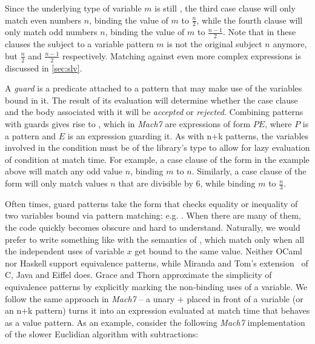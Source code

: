 Since the underlying type of variable $m$ is still , the third case 
clause will only match even numbers $n$, binding the value of $m$ to 
$\frac{n}{2}$, while the fourth clause will only match odd numbers $n$, binding 
the value of $m$ to $\frac{n-1}{2}$.  Note that in these clauses the subject to  
a variable pattern $m$ is not the original subject $n$ anymore, but 
$\frac{n}{2}$ and $\frac{n-1}{2}$ respectively. Matching against even more 
complex expressions is discussed in \textsection\ref{sec:slv}.

A \emph{guard} is a predicate attached to a pattern that may make use of the 
variables bound in it. The result of its evaluation will determine whether the 
case clause and the body associated with it will be \emph{accepted} or 
\emph{rejected}. Combining patterns with guards gives rise to , which in \emph{Mach7} are expressions of form $P$\code{|=}$E$, where $P$ is a 
pattern and $E$ is an expression guarding it. As with n+k patterns, the variables 
involved in the condition must be of the library's type  to allow 
for lazy evaluation of condition at match time. For example, a case clause of 
the form  in  the example above will match any odd value 
$n$, binding $m$ to $n$. Similarly, a case clause of the form  
will only match values $n$ that are divisible by 6, while binding $m$ to $\frac{n}{3}$.

Often times, guard patterns take the form that checks equality or inequality of 
two variables bound via pattern matching: e.g. . 
When there are many of them, the code quickly becomes obscure and hard to 
understand. Naturally, we would prefer to write something like  
with the semantics of , which match only when all the 
independent uses of variable $x$ get bound to the same value. 
Neither OCaml nor Haskell support equivalence patterns, while Miranda and Tom's 
extension~\cite{Moreau:2003} of C, Java and Eiffel does. Grace and Thorn 
approximate the simplicity of equivalence patterns by explicitly marking the 
non-binding uses of a variable. We follow the same approach in \emph{Mach7} -- a unary 
$+$ placed in front of a variable (or an n+k pattern) turns it into an 
expression evaluated at match time that behaves as a value pattern. As an 
example, consider the following \emph{Mach7} implementation of the slower 
Euclidian algorithm with subtractions:

